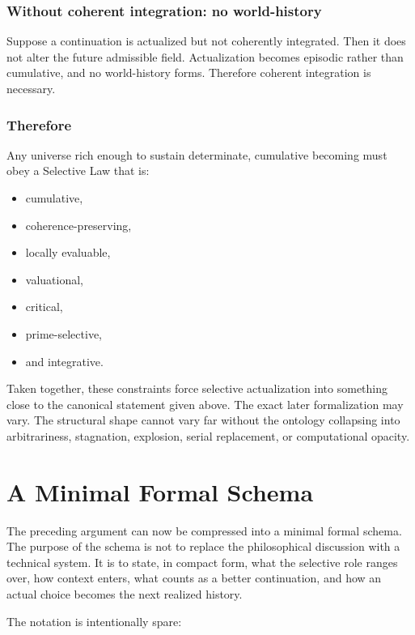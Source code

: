\documentclass[11pt]{article}
\theoremstyle{foundation}
\begin{document}
\subsubsection{Without coherent integration: no world-history}

Suppose a continuation is actualized but not coherently integrated. Then it does not alter the future admissible field. Actualization becomes episodic rather than cumulative, and no world-history forms. Therefore coherent integration is necessary.

\subsubsection{Therefore}

Any universe rich enough to sustain determinate, cumulative becoming must obey a Selective Law that is:

\begin{itemize}
    \item cumulative,
    \item coherence-preserving,
    \item locally evaluable,
    \item valuational,
    \item critical,
    \item prime-selective,
    \item and integrative.
\end{itemize}

Taken together, these constraints force selective actualization into something close to the canonical statement given above. The exact later formalization may vary. The structural shape cannot vary far without the ontology collapsing into arbitrariness, stagnation, explosion, serial replacement, or computational opacity.

\section{A Minimal Formal Schema}

The preceding argument can now be compressed into a minimal formal schema. The purpose of the schema is not to replace the philosophical discussion with a technical system. It is to state, in compact form, what the selective role ranges over, how context enters, what counts as a better continuation, and how an actual choice becomes the next realized history.

The notation is intentionally spare:
\end{document}
